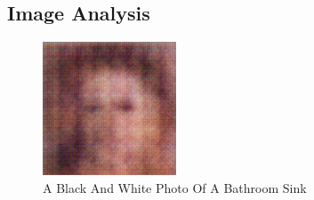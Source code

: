 \documentclass{article}%
\begin{document}
%
\subsection{Image Analysis}%
\label{subsec:ImageAnalysis}%


\begin{figure}[h!]%
\centering%
\includegraphics[width=150px]{500_fake_images/samples_5_138.png}%
\caption{A Black And White Photo Of A Bathroom Sink}%
\end{figure}

%
\end{document}
